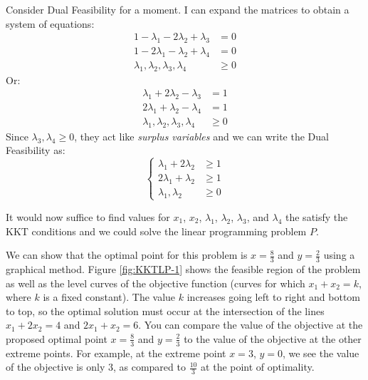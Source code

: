 Consider Dual Feasibility for a moment. I can expand the matrices to obtain a system of equations:
\begin{displaymath}
\begin{aligned}
1 - \lambda_1 - 2\lambda_2 + \lambda_3 & = 0\\
1 - 2\lambda_1 - \lambda_2 + \lambda_4 & = 0\\
\lambda_1,\lambda_2,\lambda_3,\lambda_4 & \geq 0
\end{aligned}
\end{displaymath}
Or:
\begin{displaymath}
\begin{aligned}
\lambda_1 + 2\lambda_2 - \lambda_3 &= 1\\
2\lambda_1 + \lambda_2 - \lambda_4 &= 1\\
\lambda_1,\lambda_2,\lambda_3,\lambda_4 & \geq 0
\end{aligned}
\end{displaymath}
Since $\lambda_3, \lambda_4 \geq 0$, they act like \textit{surplus variables} and we can write the Dual Feasibility as:
\begin{equation}
\left\{
\begin{aligned}
\lambda_1 + 2\lambda_2 &\geq  1\\
2\lambda_1 + \lambda_2 &\geq 1\\
\lambda_1,\lambda_2& \geq 0
\end{aligned}\right.
\label{eqn:Lambda}
\end{equation}
\begin{remark} It would now suffice to find values for $x_1$, $x_2$, $\lambda_1$, $\lambda_2$, $\lambda_3$, and $\lambda_4$ the satisfy the KKT conditions and we could solve the linear programming problem $P$.
\end{remark}

We can show that the optimal point for this problem is $x = \tfrac{8}{3}$ and $y = \tfrac{2}{3}$ using a graphical method. Figure \ref{fig:KKTLP-1} shows the feasible region of the problem as well as the level curves of the objective function (curves for which $x_1 + x_2 = k$, where $k$ is a fixed constant). The value $k$ increases going left to right and bottom to top, so the optimal solution must occur at the intersection of the lines $x_1 + 2 x_2 = 4$ and $2x_1 + x_2 = 6$. You can compare the value of the objective at the proposed optimal point $x = \tfrac{8}{3}$ and $y = \tfrac{2}{3}$ to the value of the objective at the other extreme points. For example, at the extreme point $x = 3$, $y = 0$, we see the value of the objective is only $3$, as compared to $\tfrac{10}{3}$ at the point of optimality.


